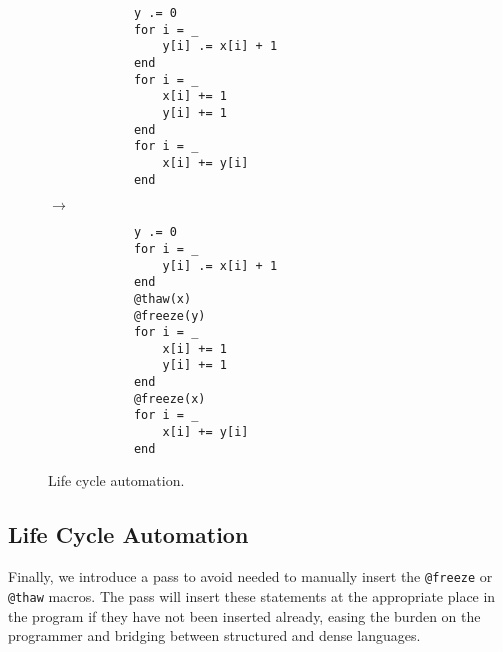     \begin{wrapfigure}{R}{0.34\linewidth}
        \begin{minipage}{0.15\textwidth}
        \begin{verbatim}
            y .= 0
            for i = _
                y[i] .= x[i] + 1
            end
            for i = _
                x[i] += 1
                y[i] += 1
            end 
            for i = _
                x[i] += y[i]
            end
        \end{verbatim}
        \end{minipage}
        $\rightarrow$
        \begin{minipage}{0.15\textwidth}
        \begin{verbatim}
            y .= 0
            for i = _
                y[i] .= x[i] + 1
            end
            @thaw(x)
            @freeze(y)
            for i = _
                x[i] += 1
                y[i] += 1
            end
            @freeze(x)
            for i = _
                x[i] += y[i]
            end
        \end{verbatim}
        \end{minipage}
        \caption{Life cycle automation.} \label{fig:lifecycles}
    \end{wrapfigure}
\subsection{Life Cycle Automation}
Finally, we introduce a pass to avoid needed to manually insert the \texttt{@freeze} or \texttt{@thaw} macros.
%
The pass will insert these statements at the appropriate place in the program if they have not been inserted already, easing the burden on the programmer and bridging between structured and dense languages.
